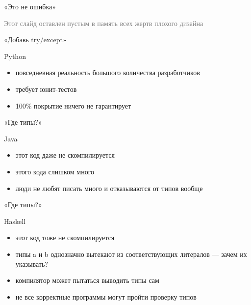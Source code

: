 \documentclass[10pt]{beamer}
\newcommand{\light}[1]{\textcolor{gray}{\footnotesize{#1}}}
\begin{document}
\begin{frame}{«Это не ошибка»}
  \begin{center}
    \light{Этот слайд оставлен пустым в память всех жертв плохого дизайна}
  \end{center}
\end{frame}

\begin{frame}{«Добавь try/except»}
  \begin{block}{Python}
    \centering
    \small
    \lstset{language=python}
    
  \end{block}
  \begin{itemize}
  \item повседневная реальность большого количества разработчиков
  \item требует юнит-тестов
  \item 100\% покрытие ничего не гарантирует
  \end{itemize}
\end{frame}

\begin{frame}{«Где типы?»}
  \begin{block}{Java}
    \centering
    \small
    \lstset{language=java}
    
  \end{block}
  \begin{itemize}
  \item этот код даже не скомпилируется
  \item этого кода слишком много
  \item люди не любят писать много и отказываются от типов вообще
  \end{itemize}
\end{frame}

\begin{frame}{«Где типы?»}
  \begin{block}{Haskell}
    \centering
    \small
    \lstset{language=haskell}
    
  \end{block}
  \begin{itemize}
  \item этот код тоже не скомпилируется
  \item типы a и b однозначно вытекают из соответствующих литералов — зачем их указывать?
  \item компилятор может пытаться выводить типы сам
  \item не все корректные программы могут пройти проверку типов
  \end{itemize}
\end{frame}
\end{document}
